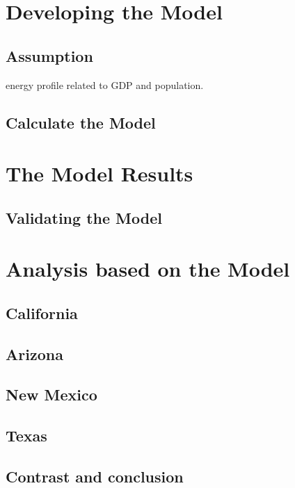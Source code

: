 \documentclass{mcmthesis}
\begin{document}
\section{Developing the Model}
\subsection{Assumption}
energy profile related to GDP and population.
\subsection{Calculate the Model}
\section{The Model Results}
\subsection{Validating the Model}

\section{Analysis based on the Model}
\subsection{California}
\subsection{Arizona}
\subsection{New Mexico}
\subsection{Texas}
\subsection{Contrast and conclusion}
\end{document}
